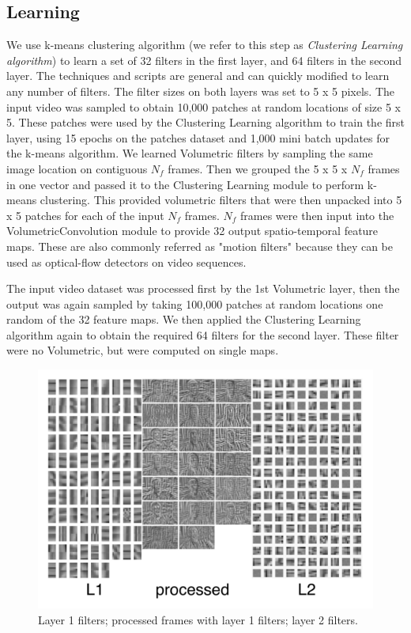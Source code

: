 \documentclass{article} %
\begin{document}
\subsection{Learning}
We use k-means clustering algorithm (we refer to this step as \textit{Clustering Learning algorithm}) to learn a set of 32 filters in the first layer, and 64 filters in the second layer. The techniques and scripts are general and can quickly modified to learn any number of filters. The filter sizes on both layers was set to 5 x 5 pixels.
The input video was sampled to obtain 10,000 patches at random locations of size 5 x 5. These patches were used by the Clustering Learning algorithm to train the first layer, using 15 epochs on the patches dataset and 1,000 mini batch updates for the k-means algorithm. We learned Volumetric filters by sampling the same image location on contiguous $N_f$ frames. Then we grouped the 5 x 5 x $N_f$ frames in one vector and passed it to the Clustering Learning module to perform k-means clustering. This provided volumetric filters that were then unpacked into 5 x 5 patches for each of the input $N_f$ frames. $N_f$ frames were then input into the VolumetricConvolution module to provide 32 output spatio-temporal feature maps. These are also commonly referred as "motion filters" because they can be used as optical-flow detectors on video sequences.

The input video dataset was processed first by the 1st Volumetric layer, then the output was again sampled by taking 100,000 patches at random locations one random of the 32 feature maps. We then applied the Clustering Learning algorithm again to obtain the required 64 filters for the second layer. These filter were no Volumetric, but were computed on single maps. 

\begin{figure}
\centering
\includegraphics[width=5in]{fig-filtersproc.png}
\caption{Layer 1 filters; processed frames with layer 1 filters; layer 2 filters.}
\label{fig-filterproc}
\end{figure}
\end{document}
